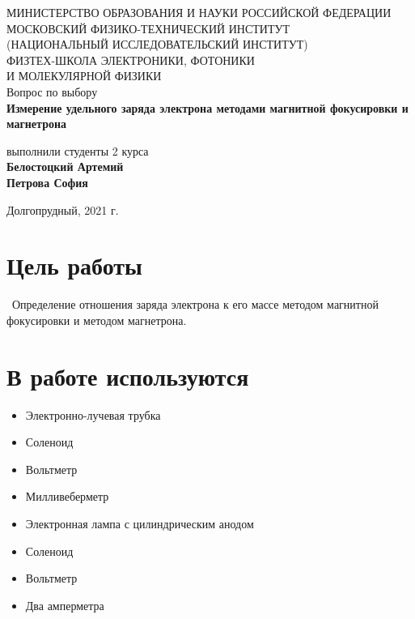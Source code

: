 \documentclass[a4paper,12pt]{article}
\begin{document}
 

\begin{titlepage}
	\begin{center}
		\large 	МИНИСТЕРСТВО ОБРАЗОВАНИЯ И НАУКИ РОССИЙСКОЙ ФЕДЕРАЦИИ\\
				МОСКОВСКИЙ ФИЗИКО-ТЕХНИЧЕСКИЙ ИНСТИТУТ \\
				(НАЦИОНАЛЬНЫЙ ИССЛЕДОВАТЕЛЬСКИЙ ИНСТИТУТ)\\ 
				ФИЗТЕХ-ШКОЛА ЭЛЕКТРОНИКИ, ФОТОНИКИ \\
				И МОЛЕКУЛЯРНОЙ ФИЗИКИ \\
		
		
		\vspace{4.0 cm}
		Вопрос по выбору \\ 
		\LARGE \textbf{Измерение удельного заряда электрона методами магнитной фокусировки и магнетрона}
	\end{center}
	\vspace{3 cm} \large
	
	\begin{flushright}
		выполнили студенты 2 курса \\
		\textbf{Белостоцкий Артемий}\\
		\textbf{Петрова София}\\
	\end{flushright}
	
	\vfill

	\begin{center}
	Долгопрудный, 2021 г.
	\end{center}
\end{titlepage}                                                                      
  
\section*{Цель работы}
\
Определение отношения заряда электрона к его массе методом магнитной фокусировки и методом магнетрона.
 
\section*{В работе используются}
\begin{itemize}
	\item Электронно-лучевая трубка
	\item Соленоид
	\item Вольтметр
	\item Милливеберметр
	\item Электронная лампа с цилиндрическим анодом
	\item Соленоид
	\item Вольтметр
	\item Два амперметра
	\end{itemize}
\end{document}
